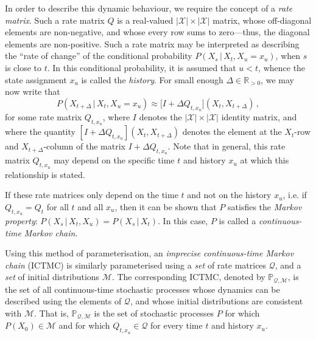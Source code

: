 \documentclass[twoside,11pt]{article}
\newcommand{\reals}{\mathbb{R}}
\newcommand{\realspos}{\reals_{>0}}
\newcommand{\states}{\mathcal{X}}
\newcommand{\rateset}{\mathcal{Q}}
\begin{document}
In order to describe this dynamic behaviour, we require the concept of a \emph{rate matrix}. Such a rate matrix $Q$ is a real-valued $\lvert\states\rvert\times\lvert\states\rvert$ matrix, whose off-diagonal elements are non-negative, and whose every row sums to zero---thus, the diagonal elements are non-positive. Such a rate matrix may be interpreted as describing the ``rate of change'' of the conditional probability $P(X_s\,\vert\,X_t,X_u=x_u)$, when $s$ is close to $t$. In this conditional probability, it is assumed that $u<t$, whence the state assignment $x_u$ is called the \emph{history}. For small enough $\Delta\in\realspos$, we may now write that
\begin{equation*}
P(X_{t+\Delta}\,\vert\,X_t,X_u=x_u) \approx \bigl[I + \Delta Q_{t,x_u}\bigr](X_t, X_{t+\Delta})\,,
\end{equation*}
for some rate matrix $Q_{t,x_u}$, where $I$ denotes the $\lvert\states\rvert\times\lvert\states\rvert$ identity matrix, and where the quantity $[I + \Delta Q_{t,x_u}](X_t,X_{t+\Delta})$ denotes the element at the $X_t$-row and $X_{t+\Delta}$-column of the matrix $I + \Delta Q_{t,x_u}$. Note that in general, this rate matrix $Q_{t,x_u}$ may depend on the specific time $t$ and history $x_u$ at which this relationship is stated. %

If these rate matrices only depend on the time $t$ and not on the history $x_u$, i.e. if $Q_{t,x_u}=Q_t$ for all $t$ and all $x_u$, then it can be shown that $P$ satisfies the \emph{Markov property}: $P(X_s\,\vert\,X_t,X_u)=P(X_s\,\vert\,X_t)$. In this case, $P$ is called a \emph{continuous-time Markov chain}.

Using this method of parameterisation, an \emph{imprecise continuous-time Markov chain} (ICTMC) is similarly parameterised using a \emph{set} of rate matrices $\rateset$, and a \emph{set} of initial distributions $\mathcal{M}$. The corresponding ICTMC, denoted by $\mathbb{P}_{\rateset,\mathcal{M}}$, is the set of all continuous-time stochastic processes whose dynamics can be described using the elements of $\rateset$, and whose initial distributions are consistent with $\mathcal{M}$. That is, $\mathbb{P}_{\rateset,\mathcal{M}}$ is the set of stochastic processes $P$ for which $P(X_0)\in\mathcal{M}$ and for which $Q_{t,x_u}\in\rateset$ for every time $t$ and history $x_u$.
\end{document}
